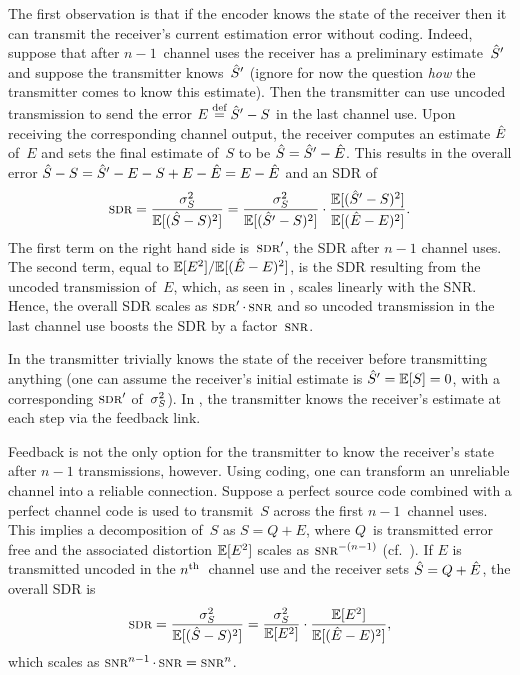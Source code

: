 The first observation is that if the encoder knows the state of the receiver
then it can transmit the receiver's current estimation error without coding. 
Indeed, suppose that after $n-1$~channel uses the receiver has a preliminary
estimate~${\hat{S}}'$ and suppose the transmitter knows~${\hat{S}}'$ (ignore for now the
question \emph{how} the transmitter comes to know this estimate). Then the
transmitter can use uncoded transmission to send the error $E \stackrel{\text{def}}{=} {\hat{S}}' - S$ in
the last channel use. Upon receiving the corresponding channel output, the
receiver computes an estimate $\hat{E}$ of~$E$ and sets the final estimate of~$S$ to
be ${\hat{S}} = {\hat{S}}' - \hat{E}$. This results in the overall error ${\hat{S}} - S = {\hat{S}}' - E - S
+ E - \hat{E} = E - \hat{E}$ and an SDR of
\begin{equation*}
  \sdr = \frac{\ssq}{\mse} = \frac{\ssq}{\E[(\Sh' - S)^2]} \cdot
  \frac{\E[(\Sh' - S)^2]}{\msee}.
\end{equation*}
The first term on the right hand side is~$\sdr'$, the SDR after $n-1$ channel
uses. The second term, equal to $\mathbb{E}[E^2]/{\mathbb{E}[(\hat{E} - E)^2]}$, is the SDR resulting from the
uncoded transmission of~$E$, which, as seen in , scales
linearly with the SNR. Hence, the overall SDR scales as $\sdr' \cdot \snr$ and
so uncoded transmission in the last channel use boosts the SDR by a
factor~$\snr$. 

In  the transmitter trivially knows the state of the receiver
before transmitting anything (one can assume the receiver's initial estimate is
${\hat{S}}' = \mathbb{E}[S] = 0$, with a corresponding $\sdr'$ of~${\sigma_S^2}$). In ,
the transmitter knows the receiver's estimate at each step via the feedback
link. 

Feedback is not the only option for the transmitter to know the receiver's state
after $n-1$ transmissions, however. Using coding, one can transform an
unreliable channel into a reliable connection. Suppose a perfect source code
combined with a perfect channel code is used to transmit~$S$ across the first
$n-1$~channel uses. This implies a decomposition of~$S$ as $S = Q + E$, where
$Q$~is transmitted error free and the associated distortion $\mathbb{E}[E^2]$ scales as
$\snr^{-(n-1)}$ (cf.~). If $E$ is transmitted
uncoded in the $n{^{\text{th}}}$~channel use and the receiver sets ${\hat{S}} = Q + \hat{E}$, the
overall SDR is \begin{equation*} \sdr = \frac{\ssq}{\mse} = \frac{\ssq}{\E[E^2]}
  \cdot \frac{\E[E^2]}{\E[(\Eh - E)^2]}, \end{equation*} which scales as
  $\snr^{n-1} \cdot \snr = \snr^n$. 

